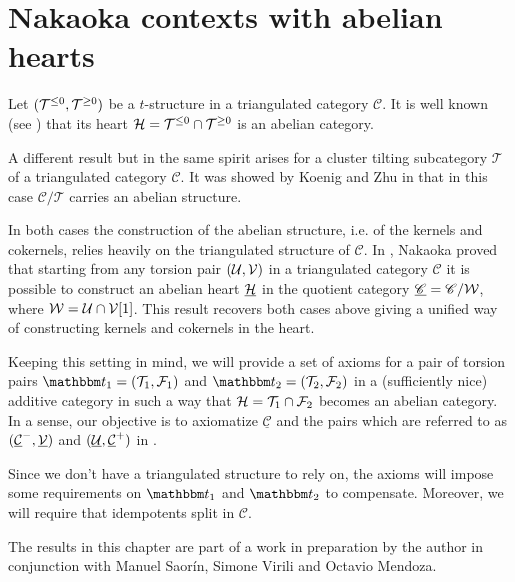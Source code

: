 \chapter{Nakaoka contexts with abelian hearts}\label{ch:nakaoka} %

Let $(\mathcal{T}^{\leq 0},\mathcal{T}^{\geq 0})$ be a $t$-structure in a triangulated category $\mathscr{C}$. It is well known (see \cite{bbd82}) that its heart $\mathcal{H}=\mathcal{T}^{\leq 0}\cap\mathcal{T}^{\geq 0}$ is an abelian category.

A different result but in the same spirit arises for a cluster tilting subcategory $\mathscr{T}$ of a triangulated category $\mathscr{C}$. It was showed by Koenig and Zhu in \cite{Koenig2008} that in this case $\mathscr{C}/\mathscr{T}$ carries an abelian structure.

In both cases the construction of the abelian structure, i.e. of the kernels and cokernels, relies heavily on the triangulated structure of $\mathscr{C}$. In \cite{Nakaokaa}, Nakaoka proved that starting from any torsion pair $(\mathcal{U},\mathcal{V})$ in a triangulated category $\mathscr{C}$ it is possible to construct an abelian heart $\underline{\mathcal{H}}$ in the quotient category $\underline{\mathscr{C}}=\mathscr{C}/\mathcal{W}$, where $\mathcal{W}=\mathcal{U}\cap\mathcal{V}[1]$. 
This result recovers both cases above giving a unified way of constructing kernels and cokernels in the heart.

Keeping this setting in mind, we will provide a set of axioms for a pair of torsion pairs $\t_1=(\T_1,\F_1)$ and $\t_2=(\T_2,\F_2)$ in a (sufficiently nice) 
additive category in such a way that $\mathcal{H} = \mathcal{T}_1\cap\mathcal{F}_2$ becomes an abelian category. In a sense, our objective is to axiomatize $\underline{\mathscr{C}}$ and the pairs which are referred to as $(\underline{\mathcal{C}}^-,\underline{\mathcal{V}})$ and $(\underline{\mathcal{U}},\underline{\mathcal{C}}^+)$ in \cite{Nakaokaa}.

Since we don't have a triangulated structure to rely on, the axioms will impose some requirements on $\t_1$ and $\t_2$ to compensate. Moreover, we will require that idempotents split in $\mathscr{C}$.

The results in this chapter are part of a work in preparation by the author in conjunction with Manuel Saor\'in, Simone Virili and Octavio Mendoza.

